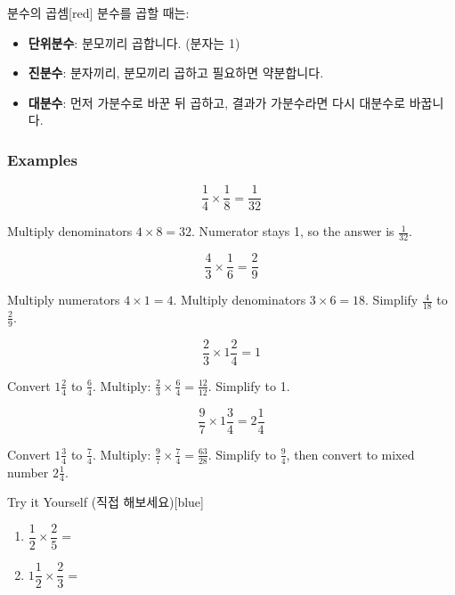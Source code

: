 \documentclass[12pt]{book}
\begin{document}
\begin{flexbox}{분수의 곱셈}[red]
분수를 곱할 때는:  
\begin{itemize}
  \item \textbf{단위분수}: 분모끼리 곱합니다. (분자는 1)  
  \item \textbf{진분수}: 분자끼리, 분모끼리 곱하고 필요하면 약분합니다.  
  \item \textbf{대분수}: 먼저 가분수로 바꾼 뒤 곱하고, 결과가 가분수라면 다시 대분수로 바꿉니다.  
\end{itemize}
\end{flexbox}

\subsubsection*{Examples}

\[
\dfrac{1}{4} \times \dfrac{1}{8} = \dfrac{1}{32}
\]

Multiply denominators $4 \times 8 = 32$.  
Numerator stays 1, so the answer is $\tfrac{1}{32}$.  




\[
\dfrac{4}{3} \times \dfrac{1}{6} = \dfrac{2}{9}
\]

Multiply numerators $4 \times 1 = 4$.  
Multiply denominators $3 \times 6 = 18$.  
Simplify $\tfrac{4}{18}$ to $\tfrac{2}{9}$.  




\[
\dfrac{2}{3} \times 1 \dfrac{2}{4} = 1
\]

Convert $1 \tfrac{2}{4}$ to $\tfrac{6}{4}$.  
Multiply: $\tfrac{2}{3} \times \tfrac{6}{4} = \tfrac{12}{12}$.  
Simplify to 1.  




\[
\dfrac{9}{7} \times 1 \dfrac{3}{4} = 2 \dfrac{1}{4}
\]

Convert $1 \tfrac{3}{4}$ to $\tfrac{7}{4}$.  
Multiply: $\tfrac{9}{7} \times \tfrac{7}{4} = \tfrac{63}{28}$.  
Simplify to $\tfrac{9}{4}$, then convert to mixed number $2 \tfrac{1}{4}$.  


\begin{flexbox}{Try it Yourself (직접 해보세요)}[blue]
\begin{enumerate}
  \item $\dfrac{1}{2} \times \dfrac{2}{5}=$ \vspace*{20pt}
  \item $1 \dfrac{1}{2} \times \dfrac{2}{3}=$ \vspace*{20pt}
\end{enumerate}
\end{flexbox}
\end{document}
